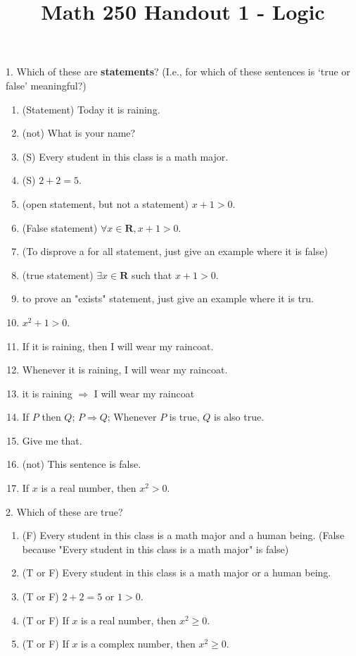 \documentclass[12pt, reqno]{amsart}
\begin{document}
\title[Math 250 Handout 1 - Logic]{Math 250 Handout 1 - Logic}\maketitle

1. Which of these are \textbf{statements}? (I.e., for which of these sentences is `true or false' meaningful?)
\vspace{10pt}
\begin{enumerate}
\item (Statement) Today it is raining.
\item (not) What is your name?
\item (S) Every student in this class is a math major.
\item (S) $2 + 2 = 5$.
\item (open statement, but not a statement) $x + 1  > 0$.
\item (False statement) $\forall x \in \mathbf{R}, x + 1  > 0$.
\item (To disprove a for all statement, just give an example where it is false)
\item (true statement) $\exists x \in \mathbf{R}$ such that  $x + 1  > 0$.
\item to prove an "exists" statement, just give an example where it is tru.
\item $x^2 + 1  > 0$.
\item If it is raining, then I will wear my raincoat.
\item Whenever it is raining, I will wear my raincoat.
\item it is raining $\Rightarrow$ I will wear my raincoat
\item If $P$ then $Q$; $P \Rightarrow Q$; Whenever $P$ is true, $Q$ is also true.
\item Give me that.
\item (not) This sentence is false.
\item If $x$ is a real number, then $x^2 > 0$.
\end{enumerate}
\vspace{20pt}

2. Which of these are true? 
\vspace{10pt}
\begin{enumerate}
\item (F) Every student in this class is a math major and a human being. (False because "Every student in this class is a math major" is false)
\item (T or F) Every student in this class is a math major or a human being.
\item (T or F) $2 + 2 = 5$ or  $1  > 0$.
\item (T or F) If $x$ is a real number, then $x^2 \geq 0$.
\item (T or F) If $x$ is a complex number, then $x^2 \geq 0$.
\end{enumerate}
\vspace{20pt}
\end{document}
